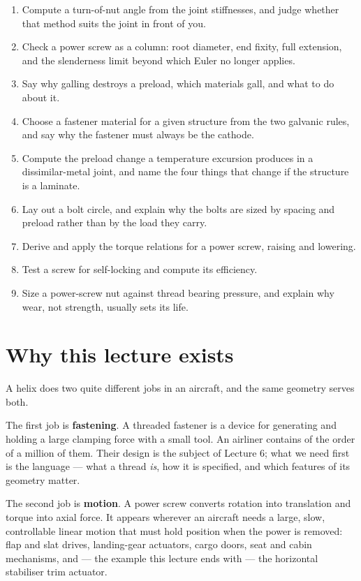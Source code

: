 \documentclass[11pt,a4paper]{article}
\begin{document}
\begin{enumerate}[nosep]
        nut may not be used for.
  \item Compute a turn-of-nut angle from the joint stiffnesses, and judge whether that method
        suits the joint in front of you.
  \item Check a power screw as a column: root diameter, end fixity, full extension, and the
        slenderness limit beyond which Euler no longer applies.
  \item Say why galling destroys a preload, which materials gall, and what to do about it.
  \item Choose a fastener material for a given structure from the two galvanic rules, and say
        why the fastener must always be the cathode.
  \item Compute the preload change a temperature excursion produces in a dissimilar-metal
        joint, and name the four things that change if the structure is a laminate.
  \item Lay out a bolt circle, and explain why the bolts are sized by spacing and preload rather than by the load they carry.
  \item Derive and apply the torque relations for a power screw, raising and lowering.
  \item Test a screw for self-locking and compute its efficiency.
  \item Size a power-screw nut against thread bearing pressure, and explain why wear, not strength, usually sets its life.
\end{enumerate}

\section{Why this lecture exists}

A helix does two quite different jobs in an aircraft, and the same geometry serves both.

The first job is \textbf{fastening}. A threaded fastener is a device for generating and holding a large
clamping force with a small tool. An airliner contains of the order of a million of them. Their design
is the subject of Lecture 6; what we need first is the language --- what a thread \emph{is}, how it is
specified, and which features of its geometry matter.

The second job is \textbf{motion}. A power screw converts rotation into translation and torque into axial
force. It appears wherever an aircraft needs a large, slow, controllable linear motion that must hold
position when the power is removed: flap and slat drives, landing-gear actuators, cargo doors, seat
and cabin mechanisms, and --- the example this lecture ends with --- the horizontal stabiliser trim
actuator.
\end{document}
